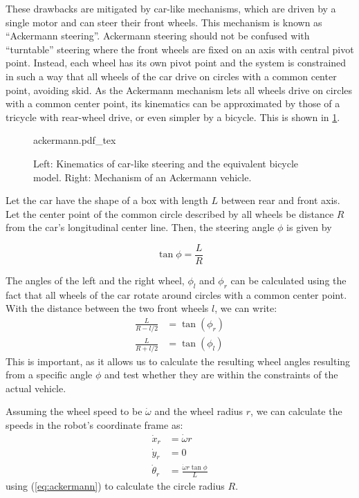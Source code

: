 These drawbacks are mitigated by car-like mechanisms, which are driven by a single motor and can steer their front wheels. This mechanism is known as ``Ackermann steering''. 
Ackermann steering should not be confused with ``turntable'' steering  where the front wheels are fixed on an axis with central pivot point.
Instead, each wheel has its own pivot point and the system is constrained in such a way that all wheels of the car drive on circles with a common center point, avoiding skid.
As the Ackermann mechanism lets all wheels drive on circles with a common center point, its kinematics can be approximated by those of a tricycle with rear-wheel drive, or even simpler by a bicycle. This is shown in \cref{fig:ackermann}.

\begin{figure}[htb!]
    \centering
    \def\svgwidth{0.9\textwidth}
    {ackermann.pdf_tex}
    \caption{Left: Kinematics of car-like steering and the equivalent bicycle model. Right: Mechanism of an Ackermann vehicle.}
    \label{fig:ackermann}
\end{figure}

Let the car have the shape of a box with length $L$ between rear and front axis. Let the center point of the common circle described by all wheels be distance $ R$ from the car's longitudinal center line.  Then, the steering angle $ \phi$ is given by

\begin{equation}\label{eq:ackermann}
\tan \phi = \frac{L}{R}
\end{equation}

The angles of the left and the right wheel, $ \phi_l$ and $ \phi_r$ can be calculated using the fact that all wheels of the car rotate around circles with a common center point. With the distance between the two front wheels $l$, we can write:
\begin{eqnarray}
\frac{L}{R-l/2}&=\tan{(\phi_r)} \nonumber \\
\frac{L}{R+l/2}&=\tan{(\phi_l)}
\end{eqnarray}
This is important, as it allows us to calculate the resulting wheel angles resulting from a specific angle $\phi$ and test whether they are within the constraints of the actual vehicle.

Assuming the wheel speed to be $\dot{\omega}$ and the wheel radius $r$, we can calculate the speeds in the robot's coordinate frame as:
\begin{eqnarray}
\dot{x}_r&=\dot{\omega}r \nonumber \\
\dot{y}_r&=0\\
\dot{\theta}_r&=\frac{\dot{\omega}r\tan\phi}{L} \nonumber
\end{eqnarray}
using (\ref{eq:ackermann}) to calculate the circle radius $R$.

